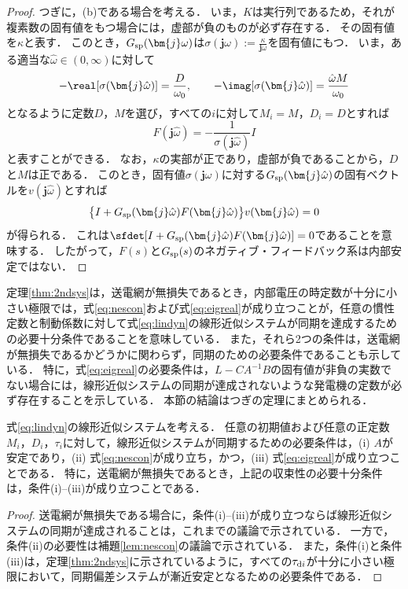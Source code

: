 \documentclass[a4j,10pt,oneside,openany,dvipdfmx]{jsbook}
\begin{document}
\begin{proof}
つぎに，(b)である場合を考える．
いま，$K$は実行列であるため，それが複素数の固有値をもつ場合には，虚部が負のものが必ず存在する．
その固有値を$\kappa$と表す．
このとき，$G_{\rm sp}(\bm{j} \omega)$は$\sigma (\bm{j} \omega):= \frac{\kappa}{\bm{j} \omega}$を固有値にもつ．
いま，ある適当な$\hat{\omega}\in (0,\infty)$に対して
\begin{equation}\label{eq:Fspara}
-\real[\sigma(\bm{j} \hat{\omega})]  = \frac{D}{\omega_0}
,\qquad
-\imag[\sigma(\bm{j} \hat{\omega})]  = \frac{\hat{\omega} M}{\omega_0}
\end{equation}
となるように定数$D$，$M$を選び，すべての$i$に対して$M_i=M$，$D_i=D$とすれば
\[
F(\bm{j} \hat{\omega}) = - \frac{1}{ \sigma(\bm{j} \hat{\omega}) } I
\]
と表すことができる．
なお，$\kappa$の実部が正であり，虚部が負であることから，$D$と$M$は正である．
このとき，固有値$\sigma (\bm{j} \omega)$に対する$G_{\rm sp}(\bm{j} \hat{\omega})$の固有ベクトルを$v(\bm{j} \hat{\omega})$とすれば
\[
\bigl\{ I+G_{\rm sp}(\bm{j} \hat{\omega})F(\bm{j} \hat{\omega})\bigr\}
v(\bm{j} \hat{\omega})
=0
\]
が得られる．
これは$\sfdet [I+G_{\rm sp}(\bm{j} \hat{\omega}) F(\bm{j} \hat{\omega})]=0$であることを意味する．
したがって，$F(s)$と$G_{\rm sp}(s)$のネガティブ・フィードバック系は内部安定ではない．
\proofend
\end{proof}




定理\ref{thm:2ndsys}は，送電網が無損失であるとき，内部電圧の時定数が十分に小さい極限では，式\eqref{eq:nescon}および式\eqref{eq:eigreal}が成り立つことが，任意の慣性定数と制動係数に対して式\eqref{eq:lindyn}の線形近似システムが同期を達成するための必要十分条件であることを意味している．
また，それら2つの条件は，送電網が無損失であるかどうかに関わらず，同期のための必要条件であることも示している．
特に，式\eqref{eq:eigreal}の必要条件は，$L-CA^{-1}B$の固有値が非負の実数でない場合には，線形近似システムの同期が達成されないような発電機の定数が必ず存在することを示している．
本節の結論はつぎの定理にまとめられる．


\begin{theorem}\label{thm:sync}
式\eqref{eq:lindyn}の線形近似システムを考える．
任意の初期値および任意の正定数$M_i$，$D_i$，$\tau_i$に対して，線形近似システムが同期するための必要条件は，(i) $A$が安定であり，(ii) 式\eqref{eq:nescon}が成り立ち，かつ，(iii) 式\eqref{eq:eigreal}が成り立つことである．
特に，送電網が無損失であるとき，上記の収束性の必要十分条件は，条件(i)--(iii)が成り立つことである．
\end{theorem}

\begin{proof}
送電網が無損失である場合に，条件(i)--(iii)が成り立つならば線形近似システムの同期が達成されることは，これまでの議論で示されている．
一方で，条件(ii)の必要性は補題\ref{lem:nescon}の議論で示されている．
また，条件(i)と条件(iii)は，定理\ref{thm:2ndsys}に示されているように，すべての$\tau_{{\rm d}i}$が十分に小さい極限において，同期偏差システムが漸近安定となるための必要条件である．
\proofend
\end{proof}
\end{document}
